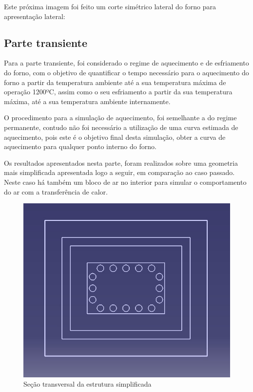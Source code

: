 Este próxima imagem foi feito um corte simétrico lateral do forno para apresentação lateral:


\subsection{Parte transiente}
Para a parte transiente, foi considerado o regime de aquecimento e de esfriamento
do forno, com o objetivo de quantificar o tempo necessário para o aquecimento do forno a
partir da temperatura ambiente até a sua temperatura máxima de operação 1200ºC, assim
como o seu esfriamento a partir da sua temperatura máxima, até a sua temperatura
ambiente internamente.

O procedimento para a simulação de aquecimento, foi semelhante a do regime
permanente, contudo não foi necessário a utilização de uma curva estimada de
aquecimento, pois este é o objetivo final desta simulação, obter a curva de aquecimento
para qualquer ponto interno do forno.

Os resultados apresentados nesta parte, foram realizados sobre uma geometria mais
simplificada apresentada logo a seguir, em comparação ao caso passado. Neste caso há
também um bloco de ar no interior para simular o comportamento do ar com a
transferência de calor.
\begin{figure}[ht]
	\centering
	\label{ansys11}
	\includegraphics[keepaspectratio=true,scale=0.8]{figuras/ansys11.jpg}
    \caption{Seção transversal da estrutura simplificada}
\end{figure}

